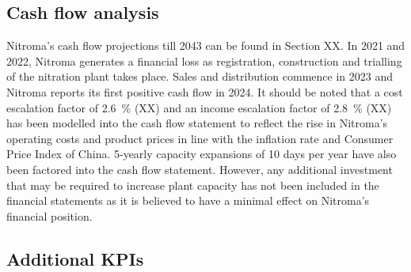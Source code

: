 \subsection{Cash flow analysis}
\label{sec:cash-flows}
Nitroma’s cash flow projections till 2043 can be found in Section XX. In 2021 and 2022, Nitroma generates a financial loss as registration, construction and trialling of the nitration plant takes place. Sales and distribution commence in 2023 and Nitroma reports its first positive cash flow in 2024. It should be noted that a cost escalation factor of \SI{2.6}{\percent} (XX) and an income escalation factor of \SI{2.8}{\percent} (XX) has been modelled into the cash flow statement to reflect the rise in Nitroma’s operating costs and product prices in line with the inflation rate and Consumer Price Index of China. 5-yearly capacity expansions of 10 days per year have also been factored into the cash flow statement. However, any additional investment that may be required to increase plant capacity has not been included in the financial statements as it is believed to have a minimal effect on Nitroma’s financial position.

\subsection{Additional KPIs}
